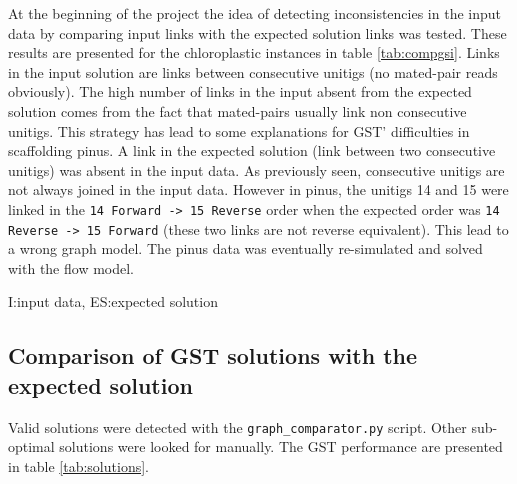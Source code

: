 \documentclass[12pt]{article}
\begin{document}
At the beginning of the project the idea of detecting inconsistencies in the input data by comparing input links with the expected solution links was tested. These results are presented for the chloroplastic instances in table \ref{tab:compgsi}. Links in the input solution are links between consecutive unitigs (no mated-pair reads obviously). The high number of links in the input absent from the expected solution comes from the fact that mated-pairs usually link non consecutive unitigs. This strategy has  lead to some explanations for GST' difficulties in scaffolding pinus. A link in the expected solution (link between two consecutive unitigs) was absent in the input data. As previously seen, consecutive unitigs are not always joined in the input data. However in pinus, the unitigs 14 and 15 were linked in the \texttt{14 Forward -> 15 Reverse} order when the expected order was \texttt{14 Reverse -> 15 Forward} (these two links are not reverse equivalent). This lead to a wrong graph model. The pinus data was eventually re-simulated and solved with the flow model. 

\begin{table}[h!]
\centering
{}
\caption{Comparison between the input linking data and the expected solution's links}
\footnotesize {\color{magenta}I}:input data, {\color{magenta}ES}:expected solution
\label{tab:compgsi}
\end{table}



\subsection{Comparison of GST solutions with the expected solution}

Valid solutions were detected with the \texttt{graph\_comparator.py} script. Other sub-optimal solutions were looked for manually. The GST performance are presented in table \ref{tab:solutions}. 
\end{document}
